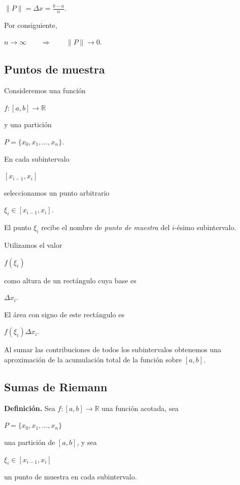 \documentclass[12pt]{article}
\begin{document}
$
\|P\|=\Delta x=\frac{b-a}{n}.
$

Por consiguiente,

$
n\longrightarrow\infty
\qquad\Longrightarrow\qquad
\|P\|\longrightarrow0.
$

\subsection*{Puntos de muestra}

Consideremos una función

$
f:[a,b]\longrightarrow\mathbb{R}
$

y una partición

$
P=\{x_0,x_1,\ldots,x_n\}.
$

En cada subintervalo

$
[x_{i-1},x_i]
$

seleccionamos un punto arbitrario

$
\xi_i\in[x_{i-1},x_i].
$

El punto $\xi_i$ recibe el nombre de \emph{punto de muestra} del
$i$-ésimo subintervalo.

Utilizamos el valor

$
f(\xi_i)
$

como altura de un rectángulo cuya base es

$
\Delta x_i.
$

El área con signo de este rectángulo es

$
f(\xi_i)\Delta x_i.
$

Al sumar las contribuciones de todos los subintervalos obtenemos una
aproximación de la acumulación total de la función sobre $[a,b]$.

\subsection*{Sumas de Riemann}

\textbf{Definición.}
Sea $f:[a,b]\to\mathbb{R}$ una función acotada, sea

$
P=\{x_0,x_1,\ldots,x_n\}
$

una partición de $[a,b]$, y sea

$
\xi_i\in[x_{i-1},x_i]
$

un punto de muestra en cada subintervalo.
\end{document}
